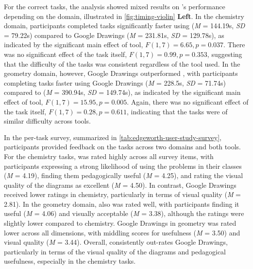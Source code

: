 For the correct tasks, the analysis showed mixed results on \Penrose's performance depending on the domain, illustrated in \cref{fig:timing-violin} \textbf{Left}. In the chemistry domain, participants completed tasks significantly faster using \Penrose (\textit{M} = 144.19s, \textit{SD} = 79.22s) compared to Google Drawings (\textit{M} = 231.81s, \textit{SD} = 129.78s), as indicated by the significant main effect of tool, $F(1, 7) = 6.65, p = 0.037$. There was no significant effect of the task itself, $F(1, 7) = 0.99, p = 0.353$, suggesting that the difficulty of the tasks was consistent regardless of the tool used. In the geometry domain, however, Google Drawings outperformed \Penrose, with participants completing tasks faster using Google Drawings (\textit{M} = 228.5s, \textit{SD} = 71.74s) compared to \Penrose (\textit{M} = 390.94s, \textit{SD} = 149.74s), as indicated by the significant main effect of tool, $F(1, 7) = 15.95, p = 0.005$. Again, there was no significant effect of the task itself, $F(1, 7) = 0.28, p = 0.611$, indicating that the tasks were of similar difficulty across tools.


In the per-task survey, summarized in \cref{tab:edgeworth-user-study-survey}, participants provided feedback on the tasks across two domains and both tools. For the chemistry tasks, \Edgeworth was rated highly across all survey items, with participants expressing a strong likelihood of using the problems in their classes (\textit{M} = 4.19), finding them pedagogically useful (\textit{M} = 4.25), and rating the visual quality of the diagrams as excellent (\textit{M} = 4.50). In contrast, Google Drawings received lower ratings in chemistry, particularly in terms of visual quality (\textit{M} = 2.81). In the geometry domain, \Edgeworth also was rated well, with participants finding it useful (\textit{M} = 4.06) and visually acceptable (\textit{M} = 3.38), although the ratings were slightly lower compared to chemistry. Google Drawings in geometry was rated lower across all dimensions, with middling scores for usefulness (\textit{M} = 3.50) and visual quality (\textit{M} = 3.44). Overall, \Edgeworth consistently out-rates Google Drawings, particularly in terms of the visual quality of the diagrams and pedagogical usefulness, especially in the chemistry tasks.



